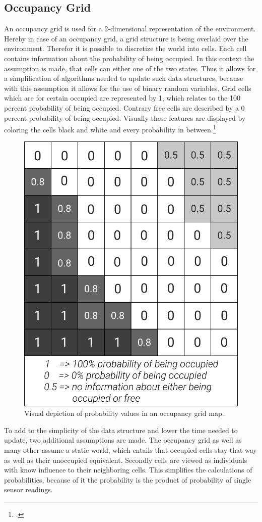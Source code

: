 \subsection{Occupancy Grid}
An occupancy grid is used for a 2-dimensional representation of the environment. Hereby in case of an occupancy grid, a grid structure is being overlaid over the environment. Therefor it is possible to discretize the world into cells. Each cell contains information about the probability of being occupied. In this context the assumption is made, that cells can either one of the two states. Thus it allows for a simplification of algorithms needed to update such data structures, because with this assumption it allows for the use of binary random variables. Grid cells which are for certain occupied are represented by 1, which relates to the 100 percent probability of being occupied. Contrary free cells are described by a 0 percent probability of being occupied. Visually these features are displayed by coloring the cells black and white and every probability in between.\footcite{OccupancyGridMaps2020}

\begin{figure}[h]
	\centering
	\includegraphics[width=0.5\linewidth]{img/OccupancyGridCells}
	\caption{Visual depiction of probability values in an occupancy grid map.}
	\label{fig:abstract_environments_occupancyCells}
\end{figure}

To add to the simplicity of the data structure and lower the time needed to update, two additional assumptions are made. The occupancy grid as well as many other assume a static world, which entails that occupied cells stay that way as well as their unoccupied equivalent. Secondly cells are viewed as individuals with know influence to their neighboring cells. This simplifies the calculations of probabilities, because of it the probability is the product of probability of single sensor readings.\newline


